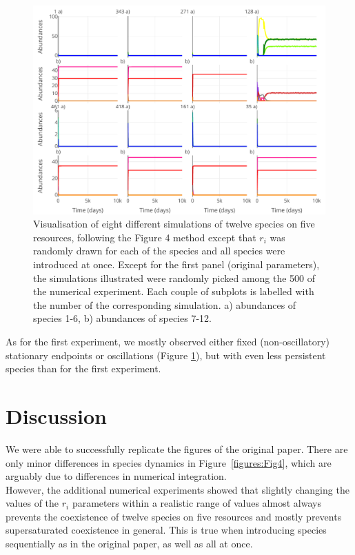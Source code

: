 \begin{figure}[H]
\begin{center} 
 \includegraphics[width=1\textwidth]{../Code/Figures/Figure_exp2.pdf}
  \caption{Visualisation of eight different simulations of twelve species on five resources, following the Figure 4 method except that $r_i$ was randomly drawn for each of the species and all species were introduced at once. Except for the first panel (original parameters), the simulations illustrated were randomly picked among the 500 of the numerical experiment. Each couple of subplots is labelled with the number of the corresponding simulation. a) abundances of species 1-6, b) abundances of species 7-12.}
  \label{figures:Figexp2}
\end{center}
\end{figure}

As for the first experiment, we mostly observed either fixed (non-oscillatory) stationary endpoints or oscillations (Figure \ref{figures:Figexp2}), but with even less persistent species than for the first experiment. 

\section{Discussion}

We were able to successfully replicate the figures of the original paper. There are only minor differences in species dynamics in Figure~\ref{figures:Fig4}, which are arguably due to differences in numerical integration.\\

However, the additional numerical experiments showed that slightly changing the values of the $r_i$ parameters within a realistic range of values \cite{2015:Edwards} almost always prevents the coexistence of twelve species on five resources and mostly prevents supersaturated coexistence in general. This is true when introducing species sequentially as in the original paper, as well as all at once.\\

